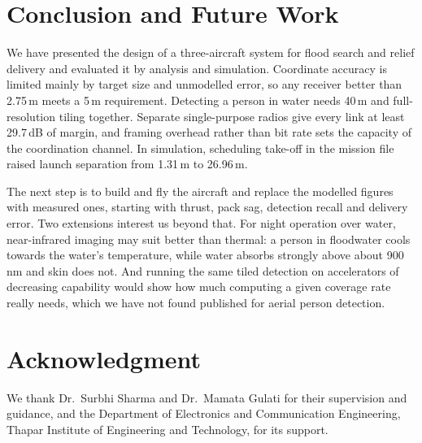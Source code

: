 \documentclass[conference]{IEEEtran}
\begin{document}
\section{Conclusion and Future Work}

We have presented the design of a three-aircraft system for flood search and
relief delivery and evaluated it by analysis and simulation. Coordinate accuracy
is limited mainly by target size and unmodelled error, so any receiver better
than 2.75\,m meets a 5\,m requirement. Detecting a person in water needs 40\,m
and full-resolution tiling together. Separate single-purpose radios give every
link at least 29.7\,dB of margin, and framing overhead rather than bit rate sets
the capacity of the coordination channel. In simulation, scheduling take-off in
the mission file raised launch separation from 1.31\,m to 26.96\,m.

The next step is to build and fly the aircraft and replace the modelled figures
with measured ones, starting with thrust, pack sag, detection recall and
delivery error. Two extensions interest us beyond that. For night operation over
water, near-infrared imaging may suit better than thermal: a person in floodwater
cools towards the water's temperature, while water absorbs strongly above about
900\,nm and skin does not. And running the same tiled detection on accelerators
of decreasing capability would show how much computing a given coverage rate
really needs, which we have not found published for aerial person detection.

\section*{Acknowledgment}

We thank Dr.~Surbhi Sharma and Dr.~Mamata Gulati for their supervision and
guidance, and the Department of Electronics and Communication Engineering,
Thapar Institute of Engineering and Technology, for its support.
\end{document}

